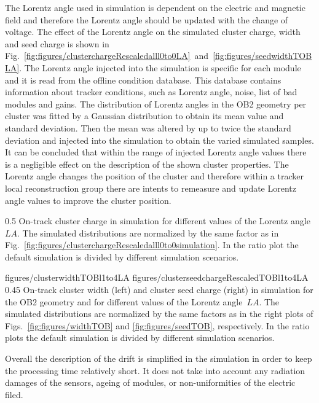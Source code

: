 The Lorentz angle used in simulation is dependent on the electric and magnetic field and therefore the Lorentz angle should be updated with the change of voltage. The effect of the Lorentz angle on the simulated cluster charge, width and seed charge is shown in Fig.~\ref{fig:figures/clusterchargeRescaledalll0to0LA}~and~\ref{fig:figures/seedwidthTOBLA}. The Lorentz angle injected into the simulation is specific for each module and it is read from the offline condition database. This database contains information about tracker conditions, such as Lorentz angle, noise, list of bad modules and gains.  The distribution of Lorentz angles in the OB2 geometry per cluster was fitted by  a Gaussian distribution to obtain its mean value and standard deviation. Then the mean was altered by up to twice the standard deviation and injected into the simulation to obtain the varied simulated samples. It can be concluded that within the range of injected Lorentz angle values there is a negligible effect on the description of the shown cluster properties. The Lorentz angle changes the position of the cluster and therefore within a tracker local reconstruction group there are intents to remeasure and update Lorentz angle values to improve the cluster position.


                 {0.5}       %
                 { On-track cluster charge in simulation for different values of the Lorentz angle~$LA$.   The simulated distributions are normalized by the same factor as in Fig.~\ref{fig:figures/clusterchargeRescaledalll0to0simulation}.  In the ratio plot the default simulation is divided by different simulation scenarios. }

                 {figures/clusterwidthTOBl1to4LA}
                 {figures/clusterseedchargeRescaledTOBl1to4LA} %
                 {0.45}       %
                 { On-track cluster width (left) and cluster seed charge (right) in simulation for the OB2 geometry and for different values of the Lorentz angle~$LA$.  The simulated distributions are normalized by the same factors as in the right plots of Figs.~\ref{fig:figures/widthTOB} and \ref{fig:figures/seedTOB}, respectively.   In the ratio plots the default simulation is divided by different simulation scenarios. }

Overall the description of the drift is simplified in the simulation in order to keep the processing time relatively short. It does not take into account any radiation damages of the sensors, ageing of modules, or non-uniformities of the electric filed.

